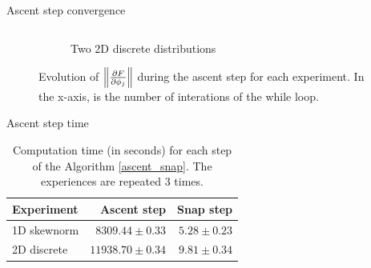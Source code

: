 \begin{frame}{Ascent step convergence}
\begin{figure}
\begin{columns}
\begin{column}{.5\textwidth}
\begin{subfigure}{\textwidth}
                \caption{Two 2D discrete distributions }
            \end{subfigure}
        \end{column}
    \end{columns}
    \caption{\centering Evolution of $\left\lVert \frac{\partial F}{\partial \phi_j} \right\rVert$ during the ascent step for each experiment. In the x-axis, is the number of interations of the while loop.}
    \end{figure}
\end{frame}

\begin{frame}{Ascent step time}
    \begin{table}
        \begin{center}
                \begin{tabular}{lrr}
                        Experiment & Ascent step & Snap step \\
                        \hline\hline
                        1D skewnorm & $8309.44 \pm 0.33$ & $5.28 \pm 0.23$ \\
                        2D discrete & $11938.70 \pm 0.34$ & $9.81 \pm 0.34$ \\
                \end{tabular}
        \end{center}
        \caption{Computation time (in seconds) for each step of the Algorithm \ref{ascent_snap}. The experiences are repeated $3$ times.}
        \label{table:time_algo_table}
    \end{table}
\end{frame}